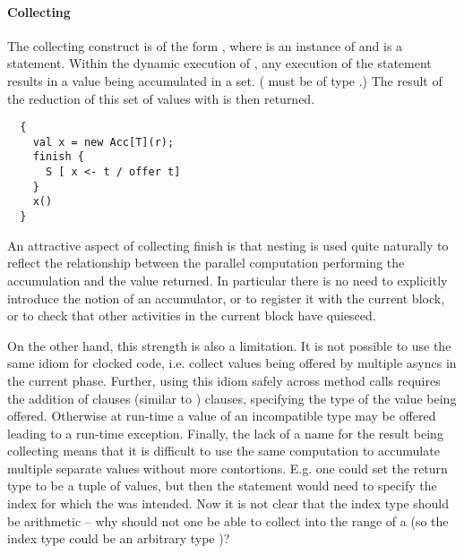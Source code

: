 
\paragraph{Collecting }

The collecting  construct is of the form , where  is an instance of  and
 is a statement. Within the dynamic execution of , any
execution of the statement  results in a value 
being accumulated in a set. ( must be of type .) The
result of the reduction of this set of  values with 
is then returned.

\begin{lstlisting}
  {
    val x = new Acc[T](r);
    finish {
      S [ x <- t / offer t]
    }
    x()
  }
\end{lstlisting}

An attractive aspect of collecting finish is that nesting is used
quite naturally to reflect the relationship between the parallel
computation performing the accumulation and the value returned. In
particular there is no need to explicitly introduce the notion of an
accumulator, or to register it with the current block, or to check
that other activities in the current block have quiesced.

On the other hand, this strength is also a limitation. It is not
possible to use the same idiom for clocked code, i.e.{} collect values
being offered by multiple  asyncs in the current phase.
Further, using this idiom safely across method calls requires the
addition of  clauses (similar to )
clauses, specifying the type of the value being offered. Otherwise at
run-time a value of an incompatible type may be offered leading to a
run-time exception. Finally, the lack of a name for the result being
collecting means that it is difficult to use the same computation to
accumulate multiple separate values without more contortions. E.g.{}
one could set the return type to be a tuple of values, but then the
 statement would need to specify the index for which the
 was intended. Now it is not clear that the index type
should be arithmetic -- why should not one be able to collect into the
range of a  (so the index type could be an arbitrary
type )?


